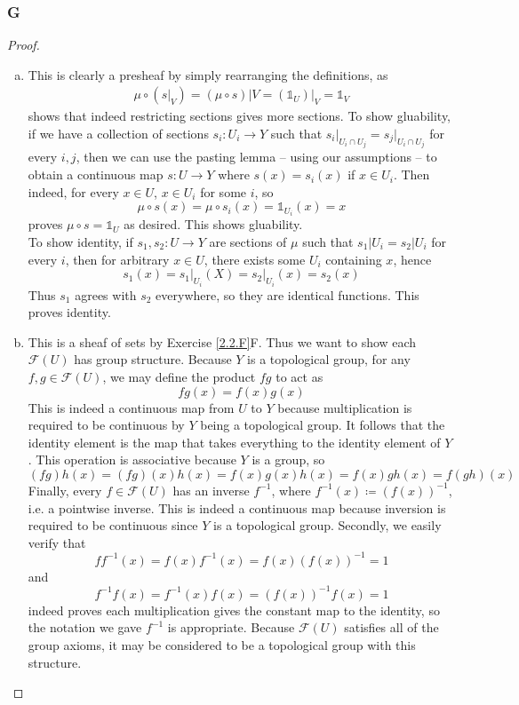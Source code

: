\documentclass{article}
\newcommand{\fF}{\mathscr{F}}
\newcommand{\altid}{\mathds{1}}
\begin{document}
\subsubsection{G}\label{2.2.G}
\begin{proof}
    \begin{enumerate}[(a)]
        \item This is clearly a presheaf by simply rearranging the definitions, as
    \begin{align}
        \mu\circ (s\vert_V)=(\mu \circ s)\vert V=(\altid_U)\vert_V=\altid_V
    \end{align}
    shows that indeed restricting sections gives more sections. To show gluability, if we have a collection of sections $s_i:U_i\to Y$ such that $s_i\vert_{U_i\cap U_j}=s_j\vert_{U_i\cap U_j}$ for every $i,j$, then we can use the pasting lemma -- using our assumptions -- to obtain a continuous map $s:U\to Y$ where $s(x)=s_i(x)$ if $x\in U_i$. Then indeed, for every $x\in U$, $x\in U_i$ for some $i$, so
    \[
    \mu \circ s(x)=\mu \circ s_i(x)=\altid_{U_i}(x)=x
    \]
    proves $\mu \circ s=\altid_U$ as desired. This shows gluability.\\
    To show identity, if $s_1,s_2:U\to Y$ are sections of $\mu$ such that $s_1\vert U_i=s_2\vert U_i$ for every $i$, then for arbitrary $x\in U$, there exists some $U_i$ containing $x$, hence
    \[
    s_1(x)=s_1\vert_{U_i}(X)=s_2\vert_{U_i}(x)=s_2(x)
    \]
    Thus $s_1$ agrees with $s_2$ everywhere, so they are identical functions. This proves identity.
    \item This is a sheaf of sets by Exercise \ref{2.2.F}F. Thus we want to show each $\fF(U)$ has group structure. Because $Y$ is a topological group, for any $f,g\in \fF(U)$, we may define the product $fg$ to act as
    \[
    fg(x)=f(x)g(x)
    \]
    This is indeed a continuous map from $U$ to $Y$ because multiplication is required to be continuous by $Y$ being a topological group. It follows that the identity element is the map that takes everything to the identity element of $Y$. This operation is associative because $Y$ is a group, so
    \[
    (fg)h(x)=(fg)(x)h(x)=f(x)g(x)h(x)=f(x)gh(x)=f(gh)(x)
    \]
    Finally, every $f\in \fF(U)$ has an inverse $f^{-1}$, where $f^{-1}(x)\coloneqq (f(x))^{-1}$, i.e. a pointwise inverse. This is indeed a continuous map because inversion is required to be continuous since $Y$ is a topological group. Secondly, we easily verify that
    \[
    f f^{-1}(x)=f(x)f^{-1}(x)=f(x)(f(x))^{-1}=1
    \]
    and
    \[
    f^{-1} f(x)=f^{-1}(x)f(x)=(f(x))^{-1}f(x)=1
    \]
    indeed proves each multiplication gives the constant map to the identity, so the notation we gave $f^{-1}$ is appropriate. Because $\fF(U)$ satisfies all of the group axioms, it may be considered to be a topological group with this structure.
    \end{enumerate}
\end{proof}
\end{document}
